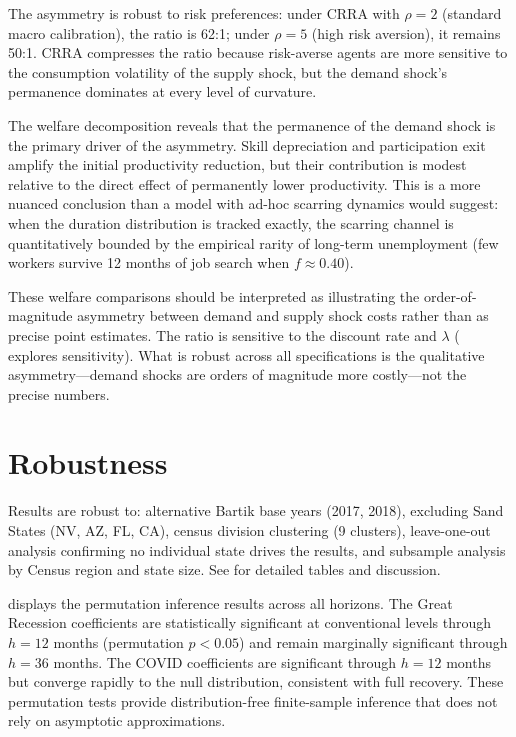 \documentclass[12pt]{article}
\begin{document}


The asymmetry is robust to risk preferences: under CRRA with $\rho = 2$ (standard macro calibration), the ratio is 62:1; under $\rho = 5$ (high risk aversion), it remains 50:1. CRRA compresses the ratio because risk-averse agents are more sensitive to the consumption volatility of the supply shock, but the demand shock's permanence dominates at every level of curvature.

The welfare decomposition reveals that the permanence of the demand shock is the primary driver of the asymmetry. Skill depreciation and participation exit amplify the initial productivity reduction, but their contribution is modest relative to the direct effect of permanently lower productivity. This is a more nuanced conclusion than a model with ad-hoc scarring dynamics would suggest: when the duration distribution is tracked exactly, the scarring channel is quantitatively bounded by the empirical rarity of long-term unemployment (few workers survive 12 months of job search when $f \approx 0.40$).

These welfare comparisons should be interpreted as illustrating the order-of-magnitude asymmetry between demand and supply shock costs rather than as precise point estimates. The ratio is sensitive to the discount rate and $\lambda$ ( explores sensitivity). What is robust across all specifications is the qualitative asymmetry---demand shocks are orders of magnitude more costly---not the precise numbers.


\section{Robustness}
\label{sec:robustness}

Results are robust to: alternative Bartik base years (2017, 2018), excluding Sand States (NV, AZ, FL, CA), census division clustering (9 clusters), leave-one-out analysis confirming no individual state drives the results, and subsample analysis by Census region and state size. See  for detailed tables and discussion.

 displays the permutation inference results across all horizons. The Great Recession coefficients are statistically significant at conventional levels through $h = 12$ months (permutation $p < 0.05$) and remain marginally significant through $h = 36$ months. The COVID coefficients are significant through $h = 12$ months but converge rapidly to the null distribution, consistent with full recovery. These permutation tests provide distribution-free finite-sample inference that does not rely on asymptotic approximations.
\end{document}
